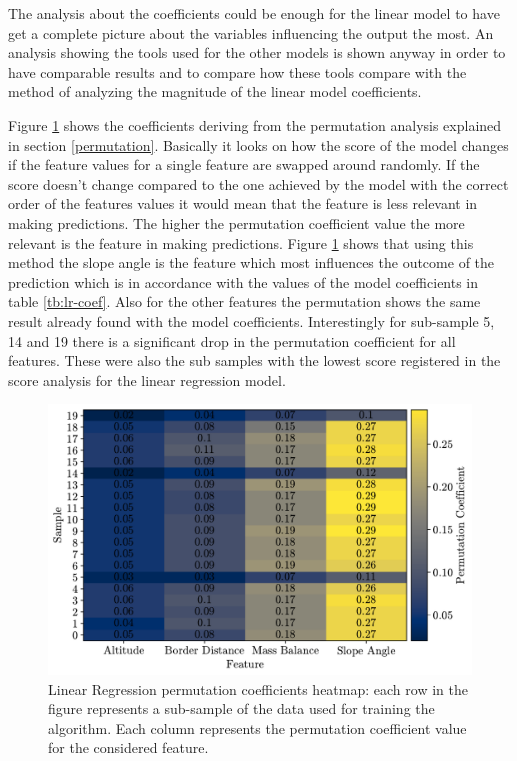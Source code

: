 The analysis about the coefficients could be enough for the linear model to have get a complete picture about the variables influencing the output the most. An analysis showing the tools used for the other models is shown anyway in order to have comparable results and to compare how these tools compare with the method of analyzing the magnitude of the linear model coefficients. 

Figure \ref{fig:lr-heatmap} shows the coefficients deriving from the permutation analysis explained in section \ref{permutation}. Basically it looks on how the score of the model changes if the feature values for a single feature are swapped around randomly. If the score doesn't change compared to the one achieved by the model with the correct order of the features values it would mean that the feature is less relevant in making predictions. The higher the permutation coefficient value the more relevant is the feature in making predictions. Figure \ref{fig:lr-heatmap} shows that using this method the slope angle is the feature which most influences the outcome of the prediction which is in accordance with the values of the model coefficients in table \ref{tb:lr-coef}. Also for the other features the permutation shows the same result already found with the model coefficients. Interestingly for sub-sample 5, 14 and 19 there is a significant drop in the permutation coefficient for all features. These were also the sub samples with the lowest score registered in the score analysis for the linear regression model.

\begin{figure}[!tp]
	\centering		  
	\includegraphics[width=1.\textwidth]{figures/LR_heatmap.pdf}
	\caption{Linear Regression permutation coefficients heatmap: each row in the figure represents a sub-sample of the data used for training the algorithm. Each column represents the permutation coefficient value for the considered feature.}
	\label{fig:lr-heatmap}
\end{figure}

